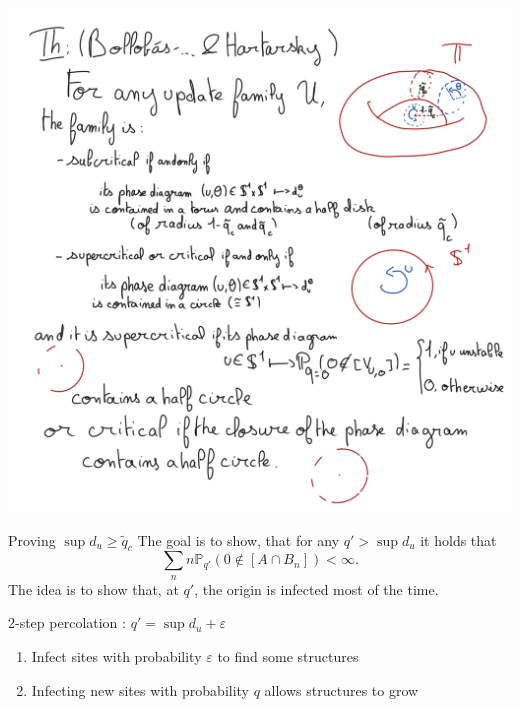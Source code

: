 \begin{frame}
	\begin{center}
    	 	\includegraphics[width=\textwidth]{th_fig.jpg}
	\end{center}
\end{frame}

\begin{frame}{Proving $\sup d_u \geq \tilde q_c$}
	The goal is to show, that for any $q'>\sup d_u$ it holds that
	\begin{equation*}
		\sum_n n \mathbb{P}_{q'}(0\not\in[A\cap B_n]) < \infty.
	\end{equation*}
	The idea is to show that, at $q'$, the origin is infected most of the time.
	\begin{block}{2-step percolation : $q' = \sup d_u + \varepsilon$}
		\begin{enumerate}
			\item Infect sites with probability $\varepsilon$ to find some structures
			\item Infecting new sites with probability $q$ allows structures to grow
		\end{enumerate}
	\end{block}
\end{frame}

